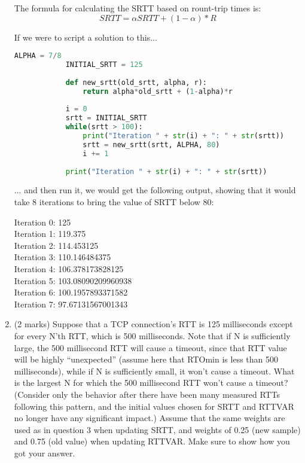 \documentclass[10pt]{amsart}
\begin{document}
\begin{enumerate}
        The formula for calculating the SRTT based on rount-trip times is:
        \[ SRTT = \alpha SRTT + (1-\alpha) * R \]

        If we were to script a solution to this...

        \begin{lstlisting}[language=python]
            ALPHA = 7/8
            INITIAL_SRTT = 125
            
            def new_srtt(old_srtt, alpha, r):
                return alpha*old_srtt + (1-alpha)*r
            
            i = 0
            srtt = INITIAL_SRTT
            while(srtt > 100):
                print("Iteration " + str(i) + ": " + str(srtt))
                srtt = new_srtt(srtt, ALPHA, 80)
                i += 1
            
            print("Iteration " + str(i) + ": " + str(srtt))
        \end{lstlisting}

        ... and then run it, we would get the following output, showing that it
        would take 8 iterations to bring the value of SRTT below 80:

        Iteration 0: 125\\
        Iteration 1: 119.375\\
        Iteration 2: 114.453125\\
        Iteration 3: 110.146484375\\
        Iteration 4: 106.378173828125\\
        Iteration 5: 103.08090209960938\\
        Iteration 6: 100.1957893371582\\
        Iteration 7: 97.67131567001343\\

    \item (2 marks) Suppose that a TCP connection’s RTT is 125 milliseconds
        except for every N’th RTT, which is 500 milliseconds. Note that if N is
        sufficiently large, the 500 millisecond RTT will cause a timeout, since
        that RTT value will be highly “unexpected” (assume here that RTOmin is
        less than 500 milliseconds), while if N is sufficiently small, it won’t
        cause a timeout. What is the largest N for which the 500 millisecond RTT
        won’t cause a timeout? (Consider only the behavior after there have been
        many measured RTTs following this pattern, and the initial values chosen
        for SRTT and RTTVAR no longer have any significant impact.) Assume that
        the same weights are used as in question 3 when updating SRTT, and
        weights of 0.25 (new sample) and 0.75 (old value) when updating RTTVAR.
        Make sure to show how you got your answer.


\end{enumerate}
\end{document}
